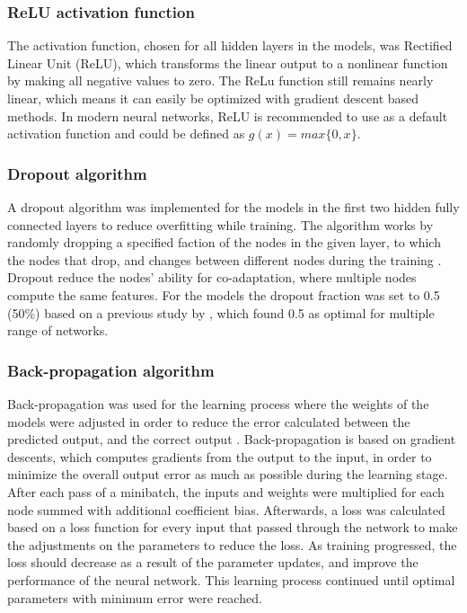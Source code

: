 \subsubsection{ReLU activation function}
The activation function, chosen for all hidden layers in the models, was Rectified Linear Unit (ReLU), which transforms the linear output to a nonlinear function by making all negative values to zero. The ReLu function still remains nearly linear, which means it can easily be optimized with gradient descent based methods. In modern neural networks, ReLU is recommended to use as a default activation function and could be defined as $g(x) = max\{0, x\}$.\citep{Goodfellow2016}

\subsubsection{Dropout algorithm}
A dropout algorithm was implemented for the models in the first two hidden fully connected layers to reduce overfitting while training. The algorithm works by randomly dropping a specified faction of the nodes in the given layer, to which the nodes that drop, and changes between different nodes during the training \citep{Srivastava2014}. Dropout reduce the nodes’ ability for co-adaptation, where multiple nodes compute the same features. For the models the dropout fraction was set to 0.5 (50\%) based on a previous study by \citeauthor{Srivastava2014} \citep{Srivastava2014}, which found 0.5 as optimal for multiple range of networks.

\subsubsection{Back-propagation algorithm}
Back-propagation was used for the learning process where the weights of the models were adjusted in order to reduce the error calculated between the predicted output, and the correct output \citep{Duda2000}. Back-propagation is based on gradient descents, which computes gradients from the output to the input, in order to minimize the overall output error as much as possible during the learning stage. 
After each pass of a minibatch, the inputs and weights were multiplied for each node summed with additional coefficient bias.\citep{LeCun1998, Hameed2016}
Afterwards, a loss was calculated based on a loss function for every input that passed through the network to make the adjustments on the parameters to reduce the loss. As training progressed, the loss should decrease as a result of the parameter updates, and improve the performance of the neural network.\citep{Goodfellow2016, LeCun2015, Duda2000} This learning process continued until optimal parameters with minimum error were reached.\citep{Hameed2016}

